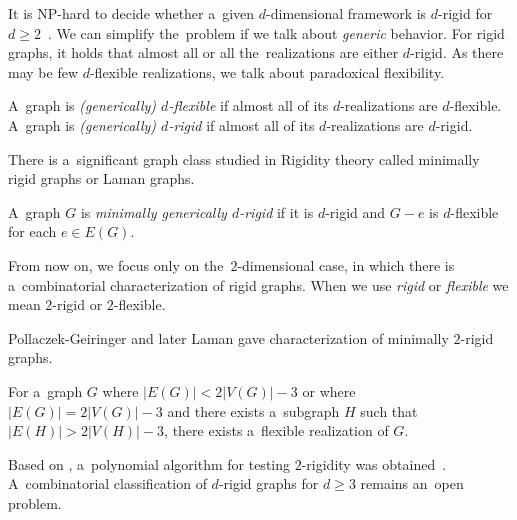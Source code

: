 It is NP-hard to decide whether a~given \( d \)-dimensional framework is
\( d \)-rigid for \( d \ge 2 \)~\cite{d_rigidity_hardness}.
We can simplify the~problem if we talk about \emph{generic} behavior.
%
For rigid graphs, it holds that almost all%
or all the~realizations are
either \( d \)-rigid.
As there may be few \( d \)-flexible realizations,
we talk about paradoxical flexibility.
%
\begin{definition}
	A~graph is \emph{(generically) \( d \)-flexible} if almost all of
	its \( d \)-realizations are \( d \)-flexible.
	A~graph is \emph{(generically) \( d \)-rigid} if almost all of
	its \( d \)-realizations are \( d \)-rigid.
\end{definition}
%


There is a~significant graph class studied in Rigidity theory
called minimally rigid graphs or Laman graphs.
%
\begin{definition}
	A~graph \( G \) is \emph{minimally generically \( d \)-rigid} if it is \( d \)-rigid
	and \( G - e \) is \(d\)-flexible for each \( e \in E(G) \).
\end{definition}
%
From now on, we focus only on the~\( 2 \)-dimensional case,
in which there is a~combinatorial characterization of rigid graphs.
When we use \emph{rigid} or \emph{flexible} we mean \( 2 \)-rigid or \( 2 \)-flexible.

Pollaczek-Geiringer and later Laman gave characterization of minimally $2$-rigid graphs.
%
%
\begin{corollary}
	For a~graph \( G \) where \( |E(G)| < 2|V(G)| - 3 \) or
	where \( |E(G)| = 2|V(G)| - 3 \) and there exists a~subgraph \( H \) such that \( |E(H)| > 2|V(H)| - 3 \),
	there exists a~flexible realization of \( G \).
\end{corollary}
%
Based on ,
a~polynomial algorithm
for testing $2$-rigidity was obtained~\cite{polynomial-min-rigid}.
A~combinatorial classification of $d$-rigid graphs
for $d \geq 3$ remains an~open problem.

